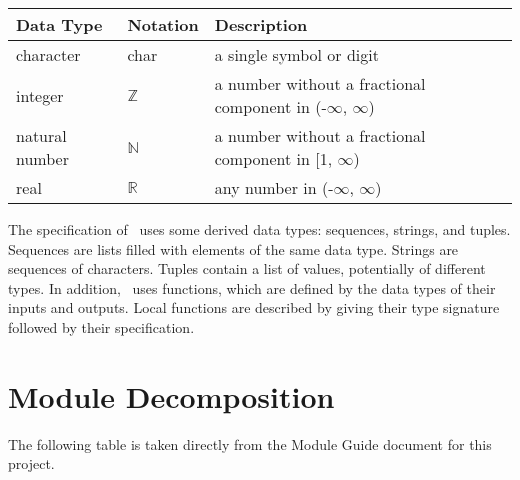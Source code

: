 \documentclass[12pt, titlepage]{article}
\begin{document}
\begin{center}
\renewcommand{\arraystretch}{1.2}
\noindent 
\begin{tabular}{l l p{7.5cm}} 
\toprule 
\textbf{Data Type} & \textbf{Notation} & \textbf{Description}\\ 
\midrule
character & char & a single symbol or digit\\
integer & $\mathbb{Z}$ & a number without a fractional component in (-$\infty$, $\infty$) \\
natural number & $\mathbb{N}$ & a number without a fractional component in [1, $\infty$) \\
real & $\mathbb{R}$ & any number in (-$\infty$, $\infty$)\\
\bottomrule
\end{tabular} 
\end{center}

\noindent
The specification of \progname \ uses some derived data types: sequences, strings, and
tuples. Sequences are lists filled with elements of the same data type. Strings
are sequences of characters. Tuples contain a list of values, potentially of
different types. In addition, \progname \ uses functions, which
are defined by the data types of their inputs and outputs. Local functions are
described by giving their type signature followed by their specification.

\newpage

\section{Module Decomposition}

The following table is taken directly from the Module Guide document for this project.
\end{document}
